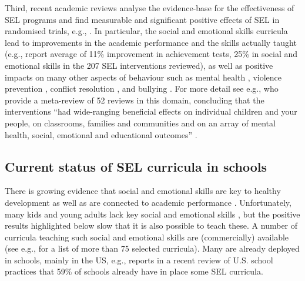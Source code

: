 \documentclass[prodmode,acmtochi]{acmsmall}
\newcommand{\GeraldineFIX}[1]{}
\newcommand{\rephrase}[1]{\textrm{\textrm{\textcolor{gray}{#1}}}}
\begin{document}
Third, recent academic reviews analyse the evidence-base for the effectiveness of SEL programs and find measurable and significant positive effects of SEL in randomised trials, e.g., \cite{Durlak2011,Greenberg2010,Weare2011}. In particular, the social and emotional skills curricula lead to improvements in the academic performance and the skills actually taught (e.g.,   report average of 11\% improvement in achievement tests, 25\% in social and emotional skills in the 207 SEL interventions reviewed), as well as positive impacts on many other aspects of behaviour such as mental health \cite{Adi2007a}, violence prevention \cite{Mytton2006,Adi2007b}, conflict resolution \cite{Garrard2007},  and bullying \cite{Vreeman2007}. For more detail see e.g.,  who provide a meta-review of 52 reviews in this domain, concluding that the interventions ``had wide-ranging beneficial effects on individual children and your people, on classrooms, families and communities and on an array of mental health, social, emotional and educational outcomes'' . 

\GeraldineFIX{G: need to provide more detailed evidence of some of the main effects?  P: Is this better? It is hard to give precise numbers, because if you give just the effect sizes that come from particular reviews most people can't read them.}


\iffalse
\subsection{Current status of SEL curricula in schools}

There is growing evidence that social and emotional skills are key to healthy development \cite{Weare2011,Adi2009a,Damon2006} as well as are connected to academic performance \cite{Durlak2011,Caprara2000}. Unfortunately, many kids and young adults lack key social and emotional skills \cite{Foster2005},  %
but the positive results highlighted below slow that it is also possible to teach these.
%
A number of curricula teaching such social and emotional skills are (commercially) available (see e.g., \cite{CASEL2003,CASEL2013} for a list of more than 75 selected curricula). Many are already deployed in schools, mainly in the US, e.g.,   reports in a recent review of U.S. school practices that 59\% of schools already have in place some SEL curricula. %
\end{document}
